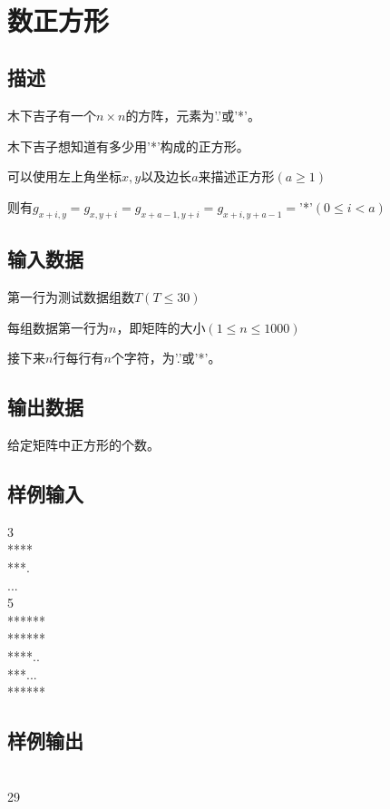\documentclass[UTF8]{ctexrep}
\begin{document}
\tt
{}
\fi


\section{数正方形}
\subsection*{描述}
木下吉子有一个$n\times n$的方阵，元素为'.'或'*'。

木下吉子想知道有多少用'*'构成的正方形。

可以使用左上角坐标$x,y$以及边长$a$来描述正方形$(a\geqslant 1)$

则有$g_{x+i,y}=g_{x,y+i}=g_{x+a-1,y+i}=g_{x+i,y+a-1}=$'*'$(0\leqslant i<a)$

\subsection*{输入数据}
第一行为测试数据组数$T(T\leqslant 30)$

每组数据第一行为$n$，即矩阵的大小$(1\leqslant n\leqslant 1000)$

接下来$n$行每行有$n$个字符，为'.'或'*'。

\subsection*{输出数据}
给定矩阵中正方形的个数。

\subsection*{样例输入}
3\\
****\\
***.\\
...\\
5 \\
****** \\
****** \\
****.. \\
***... \\
******

\subsection*{样例输出}
\\
29


\ifx\allfiles\undefined
\end{document}
